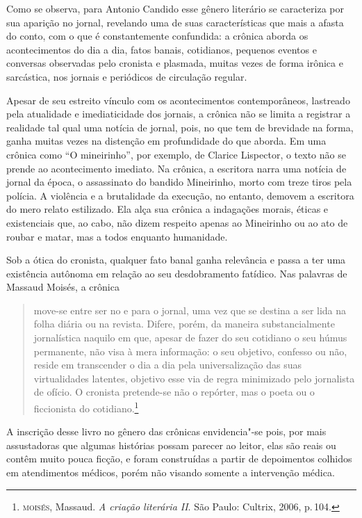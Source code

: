 Como se observa, para Antonio Candido esse gênero literário se caracteriza por sua aparição no jornal, revelando uma de suas características que mais a afasta do conto, com o que é constantemente confundida: a crônica aborda os acontecimentos do dia a dia, fatos banais, cotidianos, pequenos eventos e conversas observadas pelo cronista e plasmada, muitas vezes de forma irônica e sarcástica, nos jornais e periódicos de circulação regular.

Apesar de seu estreito vínculo com os acontecimentos contemporâneos, lastreado pela atualidade e imediaticidade dos jornais, a crônica não se limita a registrar a realidade tal qual uma notícia de jornal, pois, no que tem de brevidade na forma, ganha muitas vezes na distenção em profundidade do que aborda. Em uma crônica como ``O mineirinho'', por exemplo, de Clarice Lispector, o texto não se prende ao acontecimento imediato. Na crônica, a escritora narra uma notícia de jornal da época, o assassinato do bandido Mineirinho, morto com treze tiros pela polícia.
A violência e a brutalidade da execução, no entanto, demovem a escritora do mero relato estilizado. Ela alça sua crônica a indagações morais, éticas e existenciais que, ao cabo, não dizem respeito apenas ao Mineirinho ou ao ato de roubar e matar, mas a todos enquanto humanidade.

Sob a ótica do cronista, qualquer fato banal ganha relevância e passa a ter uma existência autônoma em relação ao seu desdobramento fatídico.
Nas palavras de Massaud Moisés, a crônica

\begin{quote}
move-se entre ser no e para o jornal,
uma vez que se destina a ser lida na folha diária ou na revista. Difere, porém,
da maneira substancialmente jornalística naquilo em que, apesar de fazer do
seu cotidiano o seu húmus permanente, não visa à mera informação: o seu
objetivo, confesso ou não, reside em transcender o dia a dia pela universalização das suas virtualidades latentes, objetivo esse via de regra minimizado
pelo jornalista de ofício. O cronista pretende-se não o repórter, mas o poeta ou
o ficcionista do cotidiano.\footnote{\textsc{moisés}, Massaud. \textit{A criação literária II}. São Paulo: Cultrix, 2006, p.\,104.}
\end{quote}

A inscrição desse livro no gênero das crônicas envidencia"-se pois, por mais assustadoras que algumas histórias possam parecer ao leitor, elas são reais ou contêm muito pouca ficção, e foram construídas a partir de depoimentos colhidos em atendimentos médicos, porém não visando somente a intervenção médica.


